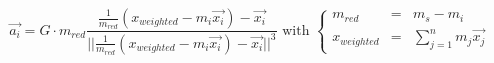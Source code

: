 \documentclass{article}
\begin{document}
\begin{equation*}
\vec{a_i} = G \cdot m_{red} 
\frac
	{
		\frac
			{1}
			{m_{red}}(x_{weighted} - m_i \vec{x_i}) - \vec{x_i}
	}
	{||
		\frac
			{1}
			{m_{red}}(x_{weighted} - m_i \vec{x_i}) - \vec{x_i}
	||^3} \text{ with }
	\left\lbrace
	\begin{matrix}
		m_{red} &=& m_s - m_i \\
		x_{weighted} &=& \sum_{j = 1}^{n} m_j \vec{x_j}
	\end{matrix}
	\right.
\end{equation*}
\end{document}
